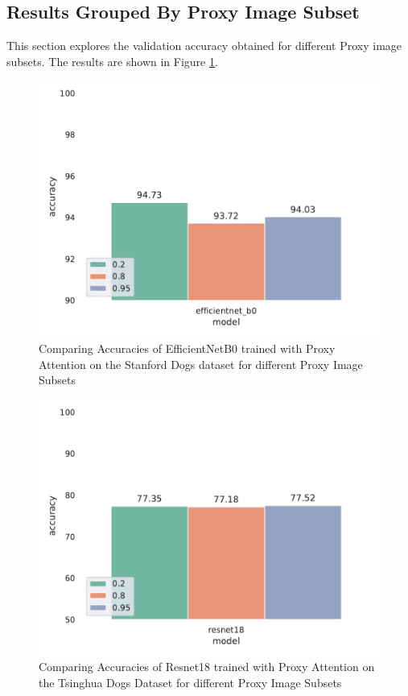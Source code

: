 \subsection{Results Grouped By Proxy Image Subset}
This section explores the validation accuracy obtained for different Proxy image subsets. The results are shown in Figure \ref{fig:proxy_subset}.

\begin{figure}[H]
    \centering
    \includegraphics[width=1\textwidth]{results/proxy_subset_attention_results.pdf}
    \caption{Comparing Accuracies of EfficientNetB0 \cite{tanEfficientnetRethinkingModel2019} trained with Proxy Attention on the Stanford Dogs dataset\cite{khoslaNovelDatasetFineGrained} for different Proxy Image Subsets}
    \label{fig:proxy_subset}
\end{figure}

\begin{figure}[H]
    \centering
    \includegraphics[width=1\textwidth]{results/proxy_subset_results_tsing.pdf}
    \caption{Comparing Accuracies of Resnet18 \cite{heDeepResidualLearning2016} trained with Proxy Attention on the Tsinghua Dogs Dataset \cite{zouNewDatasetDog2020} for different Proxy Image Subsets}
    \label{fig:proxy_subset2}
\end{figure}


